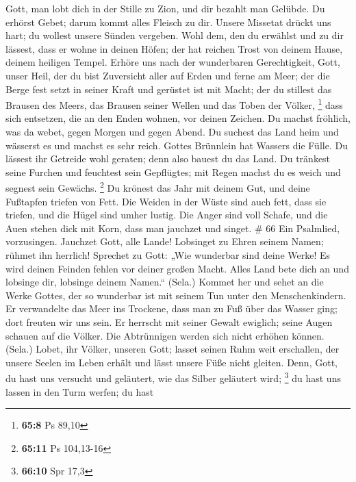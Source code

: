 Gott, man lobt dich in der Stille zu Zion, und dir bezahlt man Gelübde.
 Du erhörst Gebet; darum kommt alles Fleisch zu dir.
 Unsere Missetat drückt uns hart; du wollest unsere Sünden
vergeben.  Wohl dem, den du erwählst und zu dir lässest,
dass er wohne in deinen Höfen; der hat reichen Trost von deinem Hause,
deinem heiligen Tempel.  Erhöre uns nach der wunderbaren
Gerechtigkeit, Gott, unser Heil, der du bist Zuversicht aller auf Erden
und ferne am Meer;  der die Berge fest setzt in seiner
Kraft und gerüstet ist mit Macht;  der du stillest das
Brausen des Meers, das Brausen seiner Wellen und das Toben der Völker,
\footnote{\textbf{65:8} Ps 89,10}  dass sich entsetzen,
die an den Enden wohnen, vor deinen Zeichen. Du machst fröhlich, was da
webet, gegen Morgen und gegen Abend.  Du suchest das Land
heim und wässerst es und machst es sehr reich. Gottes Brünnlein hat
Wassers die Fülle. Du lässest ihr Getreide wohl geraten; denn also
bauest du das Land.  Du tränkest seine Furchen und
feuchtest sein Gepflügtes; mit Regen machst du es weich und segnest sein
Gewächs. \footnote{\textbf{65:11} Ps 104,13-16}  Du
krönest das Jahr mit deinem Gut, und deine Fußtapfen triefen von Fett.
 Die Weiden in der Wüste sind auch fett, dass sie
triefen, und die Hügel sind umher lustig.  Die Anger sind
voll Schafe, und die Auen stehen dick mit Korn, dass man jauchzet und
singet. \# 66  Ein Psalmlied, vorzusingen. Jauchzet Gott,
alle Lande!  Lobsinget zu Ehren seinem Namen; rühmet ihn
herrlich!  Sprechet zu Gott: „Wie wunderbar sind deine
Werke! Es wird deinen Feinden fehlen vor deiner großen Macht.
 Alles Land bete dich an und lobsinge dir, lobsinge deinem
Namen.`` (Sela.)  Kommet her und sehet an die Werke
Gottes, der so wunderbar ist mit seinem Tun unter den Menschenkindern.
 Er verwandelte das Meer ins Trockene, dass man zu Fuß
über das Wasser ging; dort freuten wir uns sein.  Er
herrscht mit seiner Gewalt ewiglich; seine Augen schauen auf die Völker.
Die Abtrünnigen werden sich nicht erhöhen können. (Sela.) 
Lobet, ihr Völker, unseren Gott; lasset seinen Ruhm weit erschallen,
 der unsere Seelen im Leben erhält und lässt unsere Füße
nicht gleiten.  Denn, Gott, du hast uns versucht und
geläutert, wie das Silber geläutert wird; \footnote{\textbf{66:10} Spr
  17,3}  du hast uns lassen in den Turm werfen; du hast
